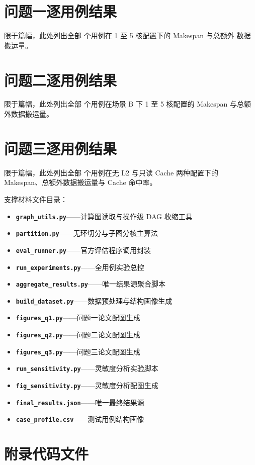 \documentclass[bwprint]{gmcmthesis}
\newcommand{\CodeGraphUtils}{\texttt{graph\_utils.py}}
\newcommand{\CodePartition}{\texttt{partition.py}}
\newcommand{\CodeEvalRunner}{\texttt{eval\_runner.py}}
\newcommand{\CodeRunExperiments}{\texttt{run\_experiments.py}}
\newcommand{\CodeAggregate}{\texttt{aggregate\_results.py}}
\newcommand{\CodeBuildDataset}{\texttt{build\_dataset.py}}
\newcommand{\CodeFiguresQOne}{\texttt{figures\_q1.py}}
\newcommand{\CodeFiguresQTwo}{\texttt{figures\_q2.py}}
\newcommand{\CodeFiguresQThree}{\texttt{figures\_q3.py}}
\newcommand{\CodeSensitivityRun}{\texttt{run\_sensitivity.py}}
\newcommand{\CodeSensitivityFig}{\texttt{fig\_sensitivity.py}}
\newcommand{\CodeFinalResults}{\texttt{final\_results.json}}
\newcommand{\CodeCaseProfile}{\texttt{case\_profile.csv}}
\begin{document}
\clearpage
\label{appendix:start}
\begin{appendices}

\section{问题一逐用例结果}

限于篇幅，此处列出全部 \CaseCount 个用例在 1 至 5 核配置下的 Makespan 与总额外
数据搬运量。



\section{问题二逐用例结果}

限于篇幅，此处列出全部 \CaseCount 个用例在场景 B 下 1 至 5 核配置的 Makespan
与总额外数据搬运量。



\section{问题三逐用例结果}

限于篇幅，此处列出全部 \CaseCount 个用例在无 L2 与只读 Cache 两种配置下的
Makespan、总额外数据搬运量与 Cache 命中率。



\par\noindent\hspace{2em}支撑材料文件目录：\par

\begin{itemize}[label={},leftmargin=1.9em,itemsep=0.25em,topsep=0.25em]
    \item \textbf{\CodeGraphUtils}——计算图读取与操作级 DAG 收缩工具
    \item \textbf{\CodePartition}——无环切分与子图分核主算法
    \item \textbf{\CodeEvalRunner}——官方评估程序调用封装
    \item \textbf{\CodeRunExperiments}——全用例实验总控
    \item \textbf{\CodeAggregate}——唯一结果源聚合脚本
    \item \textbf{\CodeBuildDataset}——数据预处理与结构画像生成
    \item \textbf{\CodeFiguresQOne}——问题一论文配图生成
    \item \textbf{\CodeFiguresQTwo}——问题二论文配图生成
    \item \textbf{\CodeFiguresQThree}——问题三论文配图生成
    \item \textbf{\CodeSensitivityRun}——灵敏度分析实验脚本
    \item \textbf{\CodeSensitivityFig}——灵敏度分析配图生成
    \item \textbf{\CodeFinalResults}——唯一最终结果源
    \item \textbf{\CodeCaseProfile}——测试用例结构画像
\end{itemize}

\section{附录代码文件}



\end{appendices}
\end{document}
